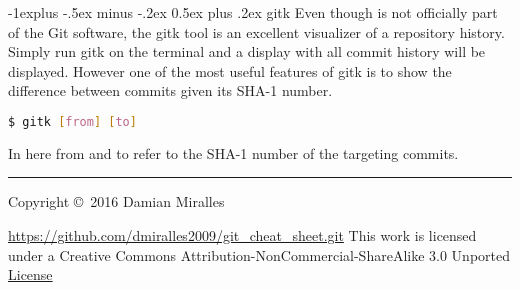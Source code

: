 \documentclass[10pt,landscape]{article}
\makeatletter
\renewcommand{\subsection}{\@startsection{subsection}{2}{0mm}%
                                {-1explus -.5ex minus -.2ex}%
                                {0.5ex plus .2ex}%
                                {\normalfont\normalsize\bfseries}}
\makeatother
\begin{document}
\begin{multicols}{3}
\subsection{gitk}
Even though is not officially part of the Git software, the gitk tool is an excellent visualizer of a repository history. Simply run gitk on the terminal and a display with all commit history will be displayed. However one of the most useful features of gitk is to show the difference between commits given its SHA-1 number.
\begin{lstlisting}[language=bash, backgroundcolor = \color{lightgray}]
 $ gitk [from] [to]
\end{lstlisting}
In here from and to refer to the SHA-1 number of the targeting commits.  

\rule{0.3\linewidth}{0.25pt}
\scriptsize

Copyright \copyright\ 2016 Damian Miralles

\href{https://github.com/dmiralles2009/git_cheat_sheet.git}{https://github.com/dmiralles2009/git\_cheat\_sheet.git} \newline
This work is licensed under a Creative Commons Attribution-NonCommercial-ShareAlike 3.0 Unported 
\href{http://creativecommons.org/licenses/by-nc-sa/3.0/}{License}

\end{multicols}
\end{document}
